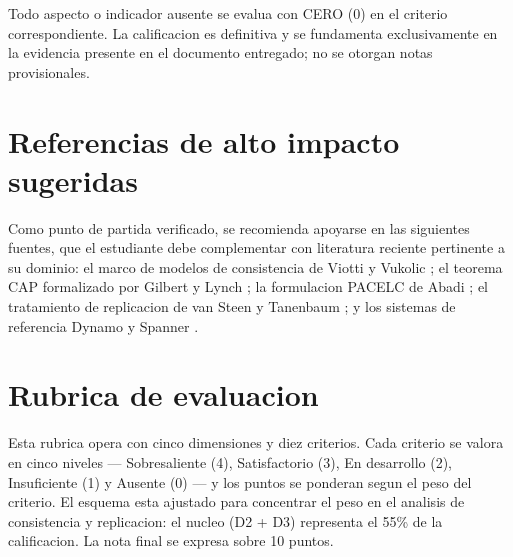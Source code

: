 \documentclass[11pt,a4paper]{article}
\newcommand{\uteqbox}[2]{%
    \begin{tcolorbox}[colback=uteqSoft,colframe=uteqBlue,boxrule=0.8pt,arc=2pt,left=6pt,right=6pt,top=5pt,bottom=5pt,title=#1,fonttitle=\bfseries]
        #2
    \end{tcolorbox}%
}
\begin{document}
\uteqbox{Piso de evaluacion (no negociable)}{%
Todo aspecto o indicador ausente se evalua con CERO (0) en el criterio correspondiente. La calificacion es definitiva y se fundamenta exclusivamente en la evidencia presente en el documento entregado; no se otorgan notas provisionales.%
}

\section{Referencias de alto impacto sugeridas}
Como punto de partida verificado, se recomienda apoyarse en las siguientes fuentes, que el estudiante debe complementar con literatura reciente pertinente a su dominio: el marco de modelos de consistencia de Viotti y Vukolic \parencite{ViottiVukolic2016Consistency}; el teorema CAP formalizado por Gilbert y Lynch \parencite{GilbertLynch2002CAP}; la formulacion PACELC de Abadi \parencite{Abadi2012PACELC}; el tratamiento de replicacion de van Steen y Tanenbaum \parencite{VanSteenTanenbaum2017DS}; y los sistemas de referencia Dynamo \parencite{DeCandia2007Dynamo} y Spanner \parencite{Corbett2013Spanner}.

\section{Rubrica de evaluacion}
Esta rubrica opera con cinco dimensiones y diez criterios. Cada criterio se valora en cinco niveles --- Sobresaliente (4), Satisfactorio (3), En desarrollo (2), Insuficiente (1) y Ausente (0) --- y los puntos se ponderan segun el peso del criterio. El esquema esta ajustado para concentrar el peso en el analisis de consistencia y replicacion: el nucleo (D2 + D3) representa el 55\% de la calificacion. La nota final se expresa sobre 10 puntos.
\end{document}
